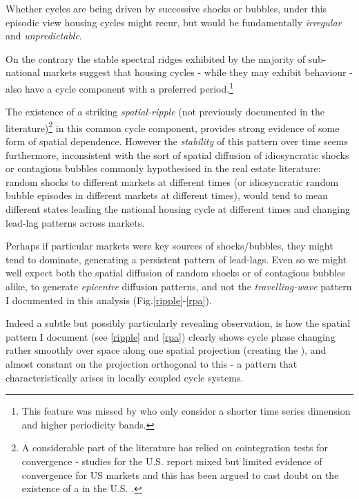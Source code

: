 \documentclass[11pt]{article}
\begin{document}
Whether cycles are being driven by successive shocks or bubbles, under this episodic view housing cycles might recur, but would be fundamentally \textit{irregular} and \textit{unpredictable}.  

On the contrary the stable spectral ridges exhibited by the majority of sub-national markets suggest that housing cycles - while they may exhibit  behaviour - also have a cycle component with a preferred period.\footnote{This feature was missed by \cite{Flor2017} who only consider a shorter time series dimension and higher periodicity bands.}

The existence of a striking \textit{spatial-ripple} (not previously documented in the literature)\footnote{A considerable part of the  literature has relied on cointegration tests for convergence - studies for the U.S. report mixed but limited evidence of convergence for US markets and this has been argued to cast doubt on the existence of a  in the U.S. \citep{Clark2009,Gil-Alana2014,Barros2012,Gupta2012,Holly2010,Holmes2011,Pollakowski1997,Zohrabyan2008}.} in this common cycle component, provides strong evidence of some form of spatial dependence. However the \textit{stability} of this pattern over time seems furthermore, inconsistent with the sort of spatial diffusion of idiosyncratic shocks \citep{Barros2012, Holmes2011,Meen1996,Meen1999,Cook2003,Drake1995,Holly2010} or contagious bubbles \citep{Riddel2011,DeFusco2013,Nneji2015} commonly hypothesised in the real estate literature: random shocks to different markets at different times (or idiosyncratic random bubble episodes in different markets at different times), would tend to mean different states leading the national housing cycle at different times and changing lead-lag patterns across markets.

Perhaps if particular markets were key sources of shocks/bubbles, they might tend to dominate, generating a persistent pattern of lead-lags. Even so we might well expect both the spatial diffusion of random shocks or of contagious bubbles alike, to generate \textit{epicentre} diffusion patterns, and not the \textit{travelling-wave} pattern I documented in this analysis (Fig.\ref{ripple}-\ref{rpa}).

Indeed a subtle but possibly particularly revealing observation, is how the spatial pattern I document (see \ref{ripple} and \ref{rpa}) clearly shows cycle phase changing rather smoothly over space along one spatial projection (creating the ), and almost constant on the projection orthogonal to this - a pattern that characteristically arises in locally coupled cycle systems.
\end{document}
